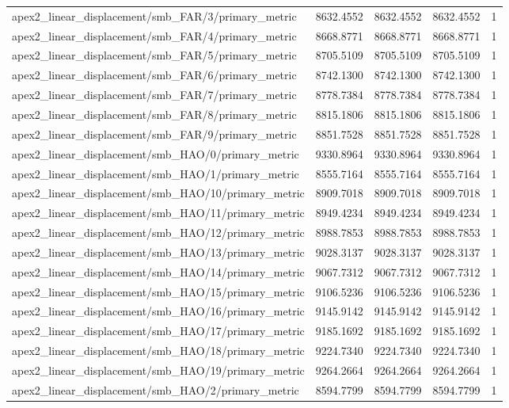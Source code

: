 \begin{table}[h]
\begin{tabular}{lrrrr}
apex2_linear_displacement/smb_FAR/3/primary_metric & 8632.4552 & 8632.4552 & 8632.4552 & 1 \\
apex2_linear_displacement/smb_FAR/4/primary_metric & 8668.8771 & 8668.8771 & 8668.8771 & 1 \\
apex2_linear_displacement/smb_FAR/5/primary_metric & 8705.5109 & 8705.5109 & 8705.5109 & 1 \\
apex2_linear_displacement/smb_FAR/6/primary_metric & 8742.1300 & 8742.1300 & 8742.1300 & 1 \\
apex2_linear_displacement/smb_FAR/7/primary_metric & 8778.7384 & 8778.7384 & 8778.7384 & 1 \\
apex2_linear_displacement/smb_FAR/8/primary_metric & 8815.1806 & 8815.1806 & 8815.1806 & 1 \\
apex2_linear_displacement/smb_FAR/9/primary_metric & 8851.7528 & 8851.7528 & 8851.7528 & 1 \\
apex2_linear_displacement/smb_HAO/0/primary_metric & 9330.8964 & 9330.8964 & 9330.8964 & 1 \\
apex2_linear_displacement/smb_HAO/1/primary_metric & 8555.7164 & 8555.7164 & 8555.7164 & 1 \\
apex2_linear_displacement/smb_HAO/10/primary_metric & 8909.7018 & 8909.7018 & 8909.7018 & 1 \\
apex2_linear_displacement/smb_HAO/11/primary_metric & 8949.4234 & 8949.4234 & 8949.4234 & 1 \\
apex2_linear_displacement/smb_HAO/12/primary_metric & 8988.7853 & 8988.7853 & 8988.7853 & 1 \\
apex2_linear_displacement/smb_HAO/13/primary_metric & 9028.3137 & 9028.3137 & 9028.3137 & 1 \\
apex2_linear_displacement/smb_HAO/14/primary_metric & 9067.7312 & 9067.7312 & 9067.7312 & 1 \\
apex2_linear_displacement/smb_HAO/15/primary_metric & 9106.5236 & 9106.5236 & 9106.5236 & 1 \\
apex2_linear_displacement/smb_HAO/16/primary_metric & 9145.9142 & 9145.9142 & 9145.9142 & 1 \\
apex2_linear_displacement/smb_HAO/17/primary_metric & 9185.1692 & 9185.1692 & 9185.1692 & 1 \\
apex2_linear_displacement/smb_HAO/18/primary_metric & 9224.7340 & 9224.7340 & 9224.7340 & 1 \\
apex2_linear_displacement/smb_HAO/19/primary_metric & 9264.2664 & 9264.2664 & 9264.2664 & 1 \\
apex2_linear_displacement/smb_HAO/2/primary_metric & 8594.7799 & 8594.7799 & 8594.7799 & 1 \\

\end{tabular}
\end{table}
